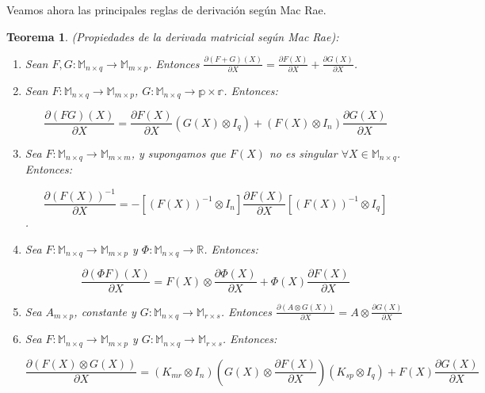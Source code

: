 \documentclass{article}
\theoremstyle{theorem-style}  %
\newtheorem{theorem}{Teorema}[section]  %
\theoremstyle{definition-style}
\theoremstyle{example-style}
\theoremstyle{exercise-style}
\begin{document}
	Veamos ahora las principales reglas de derivación según Mac Rae.
	
	\begin{theorem}
		(Propiedades de la derivada matricial según Mac Rae):
		
		\begin{enumerate}
			\item Sean $F,G: \mathbb{M}_{n \times q} \rightarrow \mathbb{M}_{m \times p}$. Entonces $\frac{\partial (F+G)(X)}{\partial X} = \frac{\partial F(X)}{\partial X} + \frac{\partial G(X)}{\partial X}$.   
			
			\item Sean $F: \mathbb{M}_{n \times q} \rightarrow \mathbb{M}_{m \times p}$, $G: \mathbb{M}_{n \times q} \rightarrow \mathbb{p \times r} $. Entonces:
			
			$$ \frac{\partial (FG)(X)}{\partial X} = \frac{\partial F(X)}{\partial X} (G(X) \otimes I_q) + (F(X) \otimes I_n) \frac{\partial G(X)}{\partial X} $$
			
			\item Sea $F: \mathbb{M}_{n \times q} \rightarrow \mathbb{M}_{m \times m}$, y supongamos que $F(X)$ no es singular $\forall X \in \mathbb{M}_{n\times q}$. Entonces:
			
			$$ \frac{\partial (F(X))^{-1}}{\partial X} = -[(F(X))^{-1} \otimes I_n ]\frac{\partial F(X)}{\partial X}[(F(X))^{-1} \otimes I_q ]$$. 
			
			\item Sea $F: \mathbb{M}_{n \times q} \rightarrow \mathbb{M}_{m \times p}$ y $\Phi: \mathbb{M}_{n \times q} \rightarrow \mathbb{R}$. Entonces:
			
			$$ \frac{\partial (\Phi F)(X)}{\partial X} = F(X) \otimes \frac{\partial \Phi(X)}{\partial X} + \Phi(X)\frac{\partial F(X)}{\partial X} $$
			
			\item Sea $A_{m \times p}$, constante y $G: \mathbb{M}_{n \times q} \rightarrow \mathbb{M}_{r \times s}$. Entonces $ \frac{\partial (A \otimes G(X))}{\partial X} = A \otimes \frac{\partial G(X)}{\partial X}$
			
			\item Sea $F: \mathbb{M}_{n \times q} \rightarrow \mathbb{M}_{m \times p}$ y $G: \mathbb{M}_{n \times q} \rightarrow \mathbb{M}_{r \times s}$. Entonces:
			
			$$ \frac{\partial(F(X) \otimes G(X))}{\partial X} = (K_{mr} \otimes I_n)(G(X) \otimes \frac{\partial F(X)}{\partial X})(K_{sp} \otimes I_q) + F(X)\frac{\partial G(X)}{\partial X} $$
			

\end{enumerate}
\end{theorem}
\end{document}
